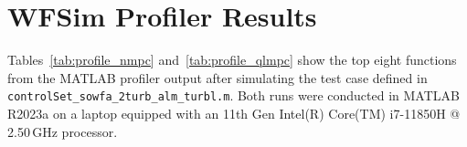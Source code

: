 % 
% 
% 
% 
% 
\chapter{WFSim Profiler Results}
\label{appendixC}

Tables~\ref{tab:profile_nmpc} and~\ref{tab:profile_qlmpc} show the top eight functions from the MATLAB profiler output after simulating the test case defined in \texttt{controlSet\_\allowbreak sowfa\_\allowbreak 2turb\_\allowbreak alm\_\allowbreak turbl.m}. Both runs were conducted in MATLAB R2023a on a laptop equipped with an 11th Gen Intel(R) Core(TM) i7-11850H @ 2.50\,GHz processor. %

